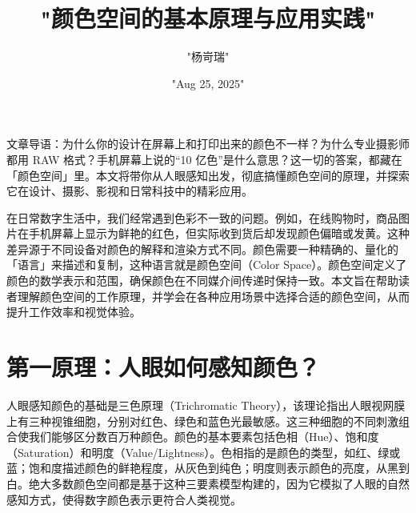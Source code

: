 \title{"颜色空间的基本原理与应用实践"}
\author{"杨岢瑞"}
\date{"Aug 25, 2025"}
\maketitle
文章导语：为什么你的设计在屏幕上和打印出来的颜色不一样？为什么专业摄影师都用 RAW 格式？手机屏幕上说的“10 亿色”是什么意思？这一切的答案，都藏在「颜色空间」里。本文将带你从人眼感知出发，彻底搞懂颜色空间的原理，并探索它在设计、摄影、影视和日常科技中的精彩应用。\par
在日常数字生活中，我们经常遇到色彩不一致的问题。例如，在线购物时，商品图片在手机屏幕上显示为鲜艳的红色，但实际收到货后却发现颜色偏暗或发黄。这种差异源于不同设备对颜色的解释和渲染方式不同。颜色需要一种精确的、量化的「语言」来描述和复制，这种语言就是颜色空间（Color Space）。颜色空间定义了颜色的数学表示和范围，确保颜色在不同媒介间传递时保持一致。本文旨在帮助读者理解颜色空间的工作原理，并学会在各种应用场景中选择合适的颜色空间，从而提升工作效率和视觉体验。\par
\chapter{第一原理：人眼如何感知颜色？}
人眼感知颜色的基础是三色原理（Trichromatic Theory），该理论指出人眼视网膜上有三种视锥细胞，分别对红色、绿色和蓝色光最敏感。这三种细胞的不同刺激组合使我们能够区分数百万种颜色。颜色的基本要素包括色相（Hue）、饱和度（Saturation）和明度（Value/Lightness）。色相指的是颜色的类型，如红、绿或蓝；饱和度描述颜色的鲜艳程度，从灰色到纯色；明度则表示颜色的亮度，从黑到白。绝大多数颜色空间都是基于这种三要素模型构建的，因为它模拟了人眼的自然感知方式，使得数字颜色表示更符合人类视觉。\par

